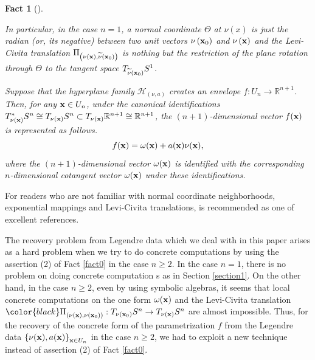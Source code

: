 \documentclass{amsart}
\newtheorem{fact}{Fact}
\theoremstyle{definition}
\theoremstyle{definition}
\theoremstyle{definition}
\newcommand{\ch}[1]{{\color{black} #1}}
\begin{document}
{\begin{fact}[\cite{nishimura}]
\begin{enumerate}
{{In particular, in the case $n=1$, a normal coordinate $\Theta$ at 
${\nu}\left(x\right)$ is just the \textit{radian} 
(or, its negative) between two unit vectors ${\nu}\left({\bf x}_0\right)$ and 
${\nu}\left({\bf x}\right)$ and the Levi-Civita translation 
$\Pi_{\left({\nu}({\bf x}), \widetilde{\nu}({\bf x}_0)\right)}$ is nothing but  
the restriction of the plane rotation through $\Theta$ to the tangent space 
$T_{\widetilde{\nu}\left({\bf x}_0\right)}S^1$}.     \\ 
\item[(2)] Suppose that the hyperplane family $\mathcal{H}_{(\nu, a)}$ creates 
an envelope $f: U_n\to \mathbb{R}^{n+1}$.     
Then, for 
any ${\bf x}\in U_n$, 
under the canonical identifications 
$ 
T^*_{{\nu}({\bf x})}S^n\cong T_{{\nu}({\bf x})}S^n 
\subset T_{{\nu}({\bf x})}\mathbb{R}^{n+1} \cong \mathbb{R}^{n+1}$, 
the $(n+1)$-dimensional vector ${f}({\bf x})$ is represented as follows.   
\[
{f}({\bf x})={\omega}({\bf x})+{a}({\bf x}){\nu}({\bf x}),   
\]  
where the $(n+1)$-dimensional vector ${\omega}({\bf x})$ is identified 
with the corresponding $n$-dimensional 
cotangent vector ${\omega}({\bf x})$ under these identifications.   
}   
\end{enumerate}
\end{fact}
\noindent 
For readers who are not familiar with normal coordinate neighborhoods,  
exponential mappings and Levi-Civita translations, 
\cite{kobayashinomizu} is recommended 
as one of excellent references.   
\par 
The recovery problem from Legendre data which we \ch{deal with} in this paper  
arises as a hard problem when we try to \ch{do concrete computations} by using 
the assertion (2) of Fact \ref{fact0} in the case 
$n\ge 2$.    
In the case $n=1$, there \ch{is} no problem on \ch{doing} concrete computation\ch{s} as in 
Section \ref{section1}.     
On the other hand, in the case $n\ge 2$, even by using 
symbolic algebras, it seems that local concrete computations on the one form 
$\omega({\bf x})$ and the Levi-Civita translation 
${\color{black}\Pi}_{\left({\nu}({\bf x}), {\nu}({\bf x}_0)\right)} : 
T_{{\nu}\left({\bf x}_0\right)}S^n\to T_ {{\nu}\left({\bf x}\right)}S^n$ 
are almost impossible.    
Thus, for the recovery of the concrete form of \ch{the} parametrization $f$ 
from \ch{the} Legendre data $\left\{\nu({\bf x}), a({\bf x})\right\}_{{\bf x}\in U_n}$ 
in the case $n\ge 2$, we had to exploit a new technique 
instead of assertion (2) of Fact \ref{fact0}.    
}   
\end{document}
